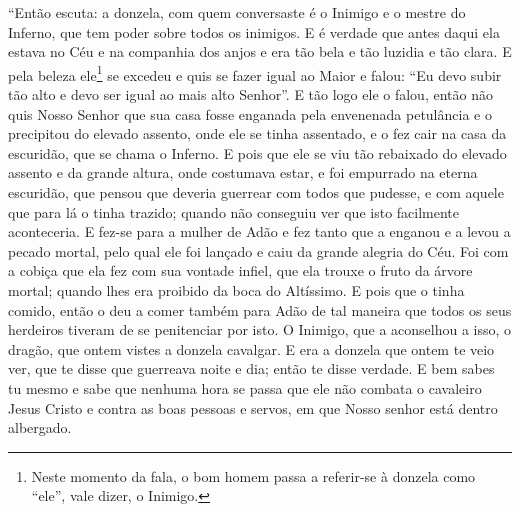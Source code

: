 “Então escuta: a donzela, com quem conversaste é o Inimigo e o mestre do
Inferno, que tem poder sobre todos os inimigos. E é verdade que antes daqui ela
estava no Céu e na companhia dos anjos e era tão bela e tão luzidia e tão
clara. E pela beleza ele\footnote{ Neste momento da fala, o bom homem passa a
referir-se à donzela como “ele”, vale dizer, o Inimigo.}  se
excedeu e quis se fazer igual ao Maior e falou: “Eu devo subir tão alto e devo
ser igual ao mais alto Senhor”. E tão logo ele o falou, então não quis Nosso
Senhor que sua casa fosse enganada pela envenenada petulância e o precipitou do
elevado assento, onde ele se tinha assentado, e o fez cair na casa da
escuridão, que se chama o Inferno. E pois que ele se viu tão rebaixado do
elevado assento e da grande altura, onde costumava estar, e foi empurrado na
eterna escuridão, que pensou que deveria guerrear com todos que pudesse, e com
aquele que para lá o tinha trazido; quando não conseguiu ver que isto
facilmente aconteceria. E fez-se para a mulher de Adão e fez tanto que a
enganou e a levou a pecado mortal, pelo qual ele foi lançado e caiu da grande
alegria do Céu. Foi com a cobiça que ela fez com sua vontade infiel, que ela
trouxe o fruto da árvore mortal; quando lhes era proibido da boca do
Altíssimo. E pois que o tinha comido, então o deu a comer também para Adão de
tal maneira que todos os seus herdeiros tiveram de se penitenciar por isto. O
Inimigo, que a aconselhou a isso, o dragão, que ontem vistes a donzela
cavalgar. E era a donzela que ontem te veio ver, que te disse que guerreava
noite e dia; então te disse verdade. E bem sabes tu mesmo e sabe que nenhuma
hora se passa que ele não combata o cavaleiro Jesus Cristo e contra as boas
pessoas e servos, em que Nosso senhor está dentro albergado. 

